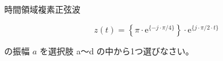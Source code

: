 時間領域複素正弦波

\[
z(t) =  \left \{ \pi \cdot \textrm{e}^{\{-j \cdot \pi/4 \}} \right \} \cdot \textrm{e}^{\{ j \cdot \pi/2 \cdot t \}}
\]

\bigskip
\noindent の振幅 $a$ を選択肢 a〜d の中から1つ選びなさい。
